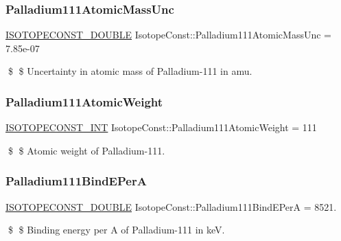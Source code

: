 \subsubsection{\texorpdfstring{Palladium111\+Atomic\+Mass\+Unc}{Palladium111AtomicMassUnc}}
{\footnotesize\ttfamily \mbox{\hyperlink{group___isotope_const-_macros_ga8f45a7272ce02c0b4c65c44636ed719a}{I\+S\+O\+T\+O\+P\+E\+C\+O\+N\+S\+T\+\_\+\+D\+O\+U\+B\+LE}} Isotope\+Const\+::\+Palladium111\+Atomic\+Mass\+Unc = 7.\+85e-\/07}

\$ \$ Uncertainty in atomic mass of Palladium-\/111 in amu. \mbox{\label{group___isotope_const-_palladium-_pd111_gadb1aa4db7654e0a355166a95edc44838}} 
\subsubsection{\texorpdfstring{Palladium111\+Atomic\+Weight}{Palladium111AtomicWeight}}
{\footnotesize\ttfamily \mbox{\hyperlink{group___isotope_const-_macros_ga5f18360b3e99483a35c32d789e62621c}{I\+S\+O\+T\+O\+P\+E\+C\+O\+N\+S\+T\+\_\+\+I\+NT}} Isotope\+Const\+::\+Palladium111\+Atomic\+Weight = 111}

\$ \$ Atomic weight of Palladium-\/111. \mbox{\label{group___isotope_const-_palladium-_pd111_gabf0fb7998588fcec4913673bb8bec860}} 
\subsubsection{\texorpdfstring{Palladium111\+Bind\+E\+PerA}{Palladium111BindEPerA}}
{\footnotesize\ttfamily \mbox{\hyperlink{group___isotope_const-_macros_ga8f45a7272ce02c0b4c65c44636ed719a}{I\+S\+O\+T\+O\+P\+E\+C\+O\+N\+S\+T\+\_\+\+D\+O\+U\+B\+LE}} Isotope\+Const\+::\+Palladium111\+Bind\+E\+PerA = 8521.}

\$ \$ Binding energy per A of Palladium-\/111 in keV. \mbox{\label{group___isotope_const-_palladium-_pd111_ga1740871993ac710bd7fbffdfcb28a1eb}} 
